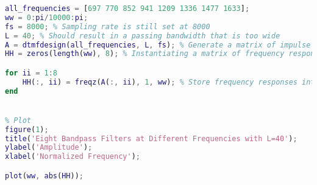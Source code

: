\begin{lstlisting}[language=Matlab]
all_frequencies = [697 770 852 941 1209 1336 1477 1633];
ww = 0:pi/10000:pi;
fs = 8000; % Sampling rate is still set at 8000
L = 40; % Should result in a passing bandwidth that is too wide
A = dtmfdesign(all_frequencies, L, fs); % Generate a matrix of impulse responses
HH = zeros(length(ww), 8); % Instantiating a matrix of frequency responses

for ii = 1:8
    HH(:, ii) = freqz(A(:, ii), 1, ww); % Store frequency responses into HH
end


% Plot
figure(1);
title('Eight Bandpass Filters at Different Frequencies with L=40');
ylabel('Amplitude');
xlabel('Normalized Frequency');

plot(ww, abs(HH));
\end{lstlisting}